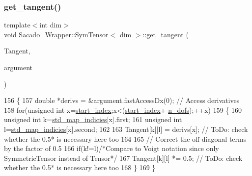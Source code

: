 \subsubsection{\texorpdfstring{get\+\_\+tangent()}{get\_tangent()}\hspace{0.1cm}{\footnotesize\ttfamily [2/2]}}
{\footnotesize\ttfamily template$<$int dim$>$ \\
void \hyperlink{classSacado__Wrapper_1_1SymTensor}{Sacado\+\_\+\+Wrapper\+::\+Sym\+Tensor}$<$ dim $>$\+::get\+\_\+tangent (\begin{DoxyParamCaption}\item[{Symmetric\+Tensor$<$ 2, dim $>$ \&}]{Tangent,  }\item[{\hyperlink{Sacado__example_8cc_a868b94676739e612d9c95940e70892a9}{fad\+\_\+double} \&}]{argument }\end{DoxyParamCaption})}


\begin{DoxyCode}
156     \{
157         \textcolor{keywordtype}{double} *derivs = &argument.fastAccessDx(0); \textcolor{comment}{// Access derivatives}
158         \textcolor{keywordflow}{for}(\textcolor{keywordtype}{unsigned} \textcolor{keywordtype}{int} x=\hyperlink{classSacado__Wrapper_1_1SymTensor_afe921e6044e4110fcfc848c52844d650}{start\_index};x<(\hyperlink{classSacado__Wrapper_1_1SymTensor_afe921e6044e4110fcfc848c52844d650}{start\_index}+
      \hyperlink{classSacado__Wrapper_1_1SymTensor_a733bc4b029ff8d067b48e7ce3ee7606b}{n\_dofs});++x)
159         \{
160             \textcolor{keywordtype}{unsigned} \textcolor{keywordtype}{int} k=\hyperlink{classSacado__Wrapper_1_1SymTensor_ae3b1c56cde3fc5c7805b618ef3d9de75}{std\_map\_indicies}[x].first;
161             \textcolor{keywordtype}{unsigned} \textcolor{keywordtype}{int} l=\hyperlink{classSacado__Wrapper_1_1SymTensor_ae3b1c56cde3fc5c7805b618ef3d9de75}{std\_map\_indicies}[x].second;
162 
163             Tangent[k][l] = derivs[x]; \textcolor{comment}{// ToDo: check whether the 0.5* is necessary here too}
164 
165             \textcolor{comment}{// Correct the off-diagonal terms by the factor of 0.5}
166              \textcolor{keywordflow}{if}(k!=l)\textcolor{comment}{/*Compare to Voigt notation since only SymmetricTensor instead of Tensor*/}
167                 Tangent[k][l] *= 0.5; \textcolor{comment}{// ToDo: check whether the 0.5* is necessary here too}
168         \}
169     \}
\end{DoxyCode}
\mbox{\label{classSacado__Wrapper_1_1SymTensor_ade8f6c8cb25c2b6e2baac06ef638c293}} 
